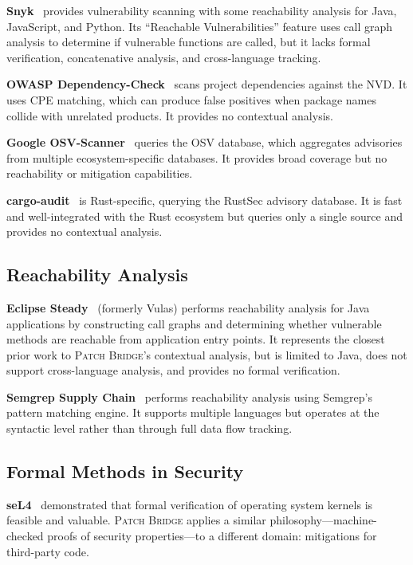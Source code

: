 \documentclass[11pt,twocolumn]{article}
\begin{document}
\textbf{Snyk}~\cite{snyk} provides vulnerability scanning with some
reachability analysis for Java, JavaScript, and Python. Its
``Reachable Vulnerabilities'' feature uses call graph analysis to
determine if vulnerable functions are called, but it lacks formal
verification, concatenative analysis, and cross-language tracking.

\textbf{OWASP Dependency-Check}~\cite{owasp-depcheck} scans project
dependencies against the NVD. It uses CPE matching, which can produce
false positives when package names collide with unrelated products.
It provides no contextual analysis.

\textbf{Google OSV-Scanner}~\cite{osv-scanner} queries the OSV
database, which aggregates advisories from multiple ecosystem-specific
databases. It provides broad coverage but no reachability or
mitigation capabilities.

\textbf{cargo-audit}~\cite{cargo-audit} is Rust-specific, querying
the RustSec advisory database. It is fast and well-integrated with the
Rust ecosystem but queries only a single source and provides no
contextual analysis.

\subsection{Reachability Analysis}

\textbf{Eclipse Steady}~\cite{eclipse-steady} (formerly Vulas) performs
reachability analysis for Java applications by constructing call graphs
and determining whether vulnerable methods are reachable from
application entry points. It represents the closest prior work to
\textsc{Patch Bridge}'s contextual analysis, but is limited to Java,
does not support cross-language analysis, and provides no formal
verification.

\textbf{Semgrep Supply Chain}~\cite{semgrep} performs reachability
analysis using Semgrep's pattern matching engine. It supports
multiple languages but operates at the syntactic level rather than
through full data flow tracking.

\subsection{Formal Methods in Security}

\textbf{seL4}~\cite{sel4} demonstrated that formal verification of
operating system kernels is feasible and valuable. \textsc{Patch Bridge}
applies a similar philosophy---machine-checked proofs of security
properties---to a different domain: mitigations for third-party code.
\end{document}
